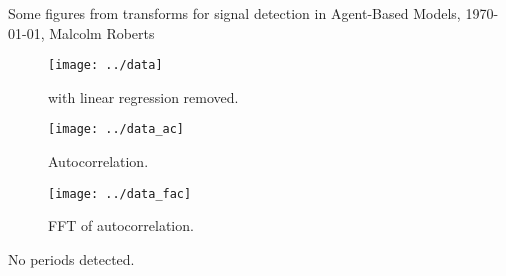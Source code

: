 \documentclass[a4paper]{article}
\newcommand{\thetitle}{Some figures from transforms for signal
  detection in Agent-Based Models}
\newcommand{\theauthor}{Malcolm Roberts}
\begin{document}
\begin{center}
  \thetitle{}, \today, \theauthor{}
\end{center}








\begin{figure}[htbp]
  \begin{center}        
    \texttt{[image: ../data]}
    \caption{\texttt{\filename} with linear regression removed.}
  \end{center}
\end{figure}

\begin{figure}[htbp]
  \begin{center}        
    \texttt{[image: ../data\_ac]}
    \caption{Autocorrelation.}
  \end{center}
\end{figure}

\begin{figure}[htbp]
  \begin{center}
    \texttt{[image: ../data\_fac]}
    \caption{FFT of autocorrelation.}
  \end{center}
\end{figure}

\begin{center}        
  No periods detected.
\end{center}
\end{document}
